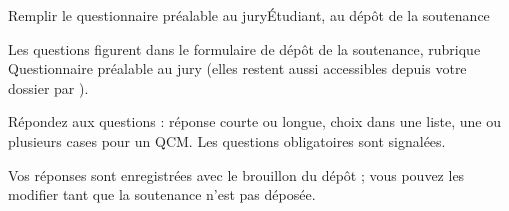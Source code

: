 \documentclass[11pt,a4paper]{article}
\begin{document}

\begin{procedure}{Remplir le questionnaire préalable au jury}{Étudiant, au dépôt de la soutenance}
\begin{etapes}
  \item Les questions figurent dans le formulaire de dépôt de la soutenance,
        rubrique \og Questionnaire préalable au jury\fg{} (elles restent aussi
        accessibles depuis votre dossier par ).
  \item Répondez aux questions : réponse courte ou longue, choix dans une
        liste, une ou plusieurs cases pour un QCM. Les questions obligatoires
        sont signalées.
  \item Vos réponses sont enregistrées avec le brouillon du dépôt ; vous
        pouvez les modifier tant que la soutenance n'est pas déposée.
\end{etapes}
\end{procedure}

\end{document}
